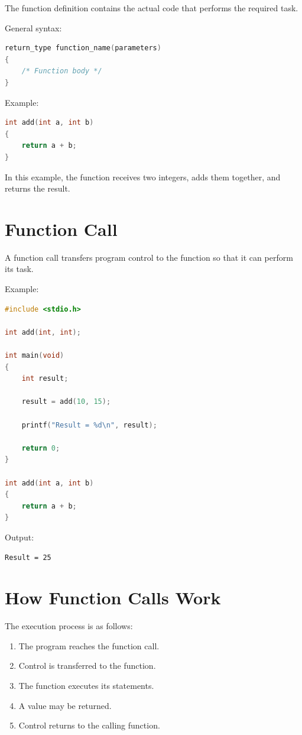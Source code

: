 \documentclass[12pt,openany]{book}
\begin{document}
The function definition contains the actual code that performs the required task.

General syntax:

\begin{lstlisting}[language=C]
return_type function_name(parameters)
{
    /* Function body */
}
\end{lstlisting}

Example:

\begin{lstlisting}[language=C]
int add(int a, int b)
{
    return a + b;
}
\end{lstlisting}

In this example, the function receives two integers, adds them together, and returns the result.

\section{Function Call}

A function call transfers program control to the function so that it can perform its task.

Example:

\begin{lstlisting}[language=C]
#include <stdio.h>

int add(int, int);

int main(void)
{
    int result;

    result = add(10, 15);

    printf("Result = %d\n", result);

    return 0;
}

int add(int a, int b)
{
    return a + b;
}
\end{lstlisting}

Output:

\begin{lstlisting}
Result = 25
\end{lstlisting}

\section{How Function Calls Work}

The execution process is as follows:

\begin{enumerate}
    \item The program reaches the function call.
    \item Control is transferred to the function.
    \item The function executes its statements.
    \item A value may be returned.
    \item Control returns to the calling function.
\end{enumerate}
\end{document}
